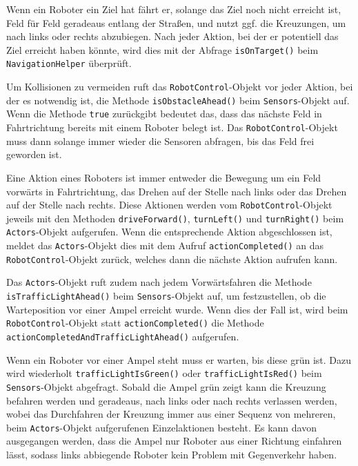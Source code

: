 Wenn ein Roboter ein Ziel hat fährt er, solange das Ziel noch nicht erreicht ist, Feld für Feld geradeaus entlang der Straßen, und nutzt ggf. die Kreuzungen, um nach links oder rechts abzubiegen. 
Nach jeder Aktion, bei der er potentiell das Ziel erreicht haben könnte, wird dies mit der Abfrage \texttt{isOnTarget()} beim \texttt{NavigationHelper} überprüft.

Um Kollisionen zu vermeiden ruft das \texttt{RobotControl}-Objekt vor jeder Aktion, bei der es notwendig ist, die Methode \texttt{isObstacleAhead()} beim \texttt{Sensors}-Objekt auf. Wenn die Methode \texttt{true} zurückgibt bedeutet das, dass das nächste Feld in Fahrtrichtung bereits mit einem Roboter belegt ist. Das \texttt{RobotControl}-Objekt muss dann solange immer wieder die Sensoren abfragen, bis das Feld frei geworden ist.

Eine Aktion eines Roboters ist immer entweder die Bewegung um ein Feld vorwärts in Fahrtrichtung, das Drehen auf der Stelle nach links oder das Drehen auf der Stelle nach rechts. Diese Aktionen werden vom \texttt{RobotControl}-Objekt jeweils mit den Methoden \texttt{driveForward()}, \texttt{turnLeft()} und \texttt{turnRight()} beim \texttt{Actors}-Objekt aufgerufen.
Wenn die entsprechende Aktion abgeschlossen ist, meldet das \texttt{Actors}-Objekt dies mit dem Aufruf \texttt{actionCompleted()} an das \texttt{RobotControl}-Objekt zurück, welches dann die nächste Aktion aufrufen kann.

Das \texttt{Actors}-Objekt ruft zudem nach jedem Vorwärtsfahren die Methode \texttt{isTrafficLightAhead()} beim \texttt{Sensors}-Objekt auf, um festzustellen, ob die Warteposition vor einer Ampel erreicht wurde. Wenn dies der Fall ist, wird beim \texttt{RobotControl}-Objekt statt \texttt{actionCompleted()} die Methode \texttt{actionCompletedAndTrafficLightAhead()} aufgerufen.

Wenn ein Roboter vor einer Ampel steht muss er warten, bis diese grün ist. Dazu wird wiederholt \texttt{trafficLightIsGreen()} oder \texttt{trafficLightIsRed()} beim \texttt{Sensors}-Objekt abgefragt. 
Sobald die Ampel grün zeigt kann die Kreuzung befahren werden und geradeaus, nach links oder nach rechts verlassen werden, wobei das Durchfahren der Kreuzung immer aus einer Sequenz von mehreren, beim \texttt{Actors}-Objekt aufgerufenen Einzelaktionen besteht. 
Es kann davon ausgegangen werden, dass die Ampel nur Roboter aus einer Richtung einfahren lässt, sodass links abbiegende Roboter kein Problem mit Gegenverkehr haben. 

